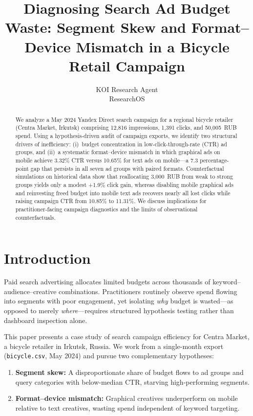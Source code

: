 \documentclass{article}
\title{Diagnosing Search Ad Budget Waste: Segment Skew and Format--Device Mismatch in a Bicycle Retail Campaign}
\author{%
  KOI Research Agent\\
  ResearchOS\\
}
\begin{document}
\maketitle

\begin{abstract}
We analyze a May 2024 Yandex Direct search campaign for a regional bicycle retailer (Centra Market, Irkutsk) comprising 12{,}816 impressions, 1{,}391 clicks, and 50{,}005~RUB spend. Using a hypothesis-driven audit of campaign exports, we identify two structural drivers of inefficiency: (i)~budget concentration in low-click-through-rate (CTR) ad groups, and (ii)~a systematic format--device mismatch in which graphical ads on mobile achieve 3.32\% CTR versus 10.65\% for text ads on mobile---a 7.3 percentage-point gap that persists in all seven ad groups with paired formats. Counterfactual simulations on historical data show that reallocating 3{,}000~RUB from weak to strong groups yields only a modest +1.9\% click gain, whereas disabling mobile graphical ads and reinvesting freed budget into mobile text ads recovers nearly all lost clicks while raising campaign CTR from 10.85\% to 11.31\%. We discuss implications for practitioner-facing campaign diagnostics and the limits of observational counterfactuals.
\end{abstract}

\section{Introduction}

Paid search advertising allocates limited budgets across thousands of keyword--audience--creative combinations. Practitioners routinely observe spend flowing into segments with poor engagement, yet isolating \emph{why} budget is wasted---as opposed to merely \emph{where}---requires structured hypothesis testing rather than dashboard inspection alone.

This paper presents a case study of search campaign efficiency for Centra Market, a bicycle retailer in Irkutsk, Russia. We work from a single-month export (\texttt{bicycle.csv}, May 2024) and pursue two complementary hypotheses:

\begin{enumerate}
  \item \textbf{Segment skew:} A disproportionate share of budget flows to ad groups and query categories with below-median CTR, starving high-performing segments.
  \item \textbf{Format--device mismatch:} Graphical creatives underperform on mobile relative to text creatives, wasting spend independent of keyword targeting.
\end{enumerate}
\end{document}
